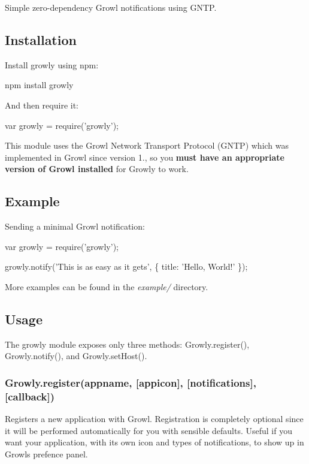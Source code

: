 Simple zero-\/dependency Growl notifications using G\+N\+TP.

\subsection*{Installation}

Install growly using {\ttfamily npm}\+:


\begin{DoxyCode}
npm install growly
\end{DoxyCode}


And then require it\+:


\begin{DoxyCode}
var growly = require('growly');
\end{DoxyCode}


This module uses the Growl Network Transport Protocol (G\+N\+TP) which was implemented in Growl since version 1., so you {\bfseries must have an appropriate version of Growl installed} for Growly to work.

\subsection*{Example}

Sending a minimal Growl notification\+:


\begin{DoxyCode}
var growly = require('growly');

growly.notify('This is as easy as it gets', \{ title: 'Hello, World!' \});
\end{DoxyCode}


More examples can be found in the {\itshape example/} directory.

\subsection*{Usage}

The growly module exposes only three methods\+: {\ttfamily Growly.\+register()}, {\ttfamily Growly.\+notify()}, and {\ttfamily Growly.\+set\+Host()}.

\subsubsection*{Growly.\+register(appname, \mbox{[}appicon\mbox{]}, \mbox{[}notifications\mbox{]}, \mbox{[}callback\mbox{]})}

Registers a new application with Growl. Registration is completely optional since it will be performed automatically for you with sensible defaults. Useful if you want your application, with its own icon and types of notifications, to show up in Growl\textquotesingle{}s prefence panel.


